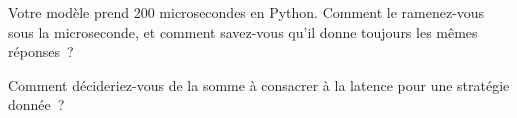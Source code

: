 \begin{interviewq}\label{iq:ml:build-an-order-book-model-end-to-end:5}
Votre modèle prend 200 microsecondes en Python. Comment le ramenez-vous sous la microseconde, et comment savez-vous qu'il donne toujours les mêmes
réponses~?
\end{interviewq}

\begin{interviewq}\label{iq:ml:build-an-order-book-model-end-to-end:6}
Comment décideriez-vous de la somme à consacrer à la latence pour une stratégie donnée~?
\end{interviewq}
